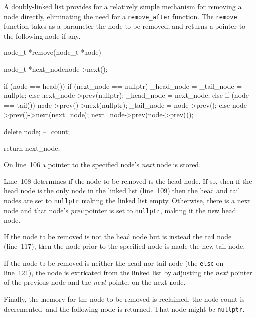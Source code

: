 \documentclass{article}
\begin{document}
  A doubly-linked list provides for a relatively simple mechanism for removing a node directly, eliminating the need for a \verb|remove_after| function. The \verb|remove| function takes as a parameter the node to be removed, and returns a pointer to the following node if any.
  \begin{lstcpp}
  node_t *remove(node_t *node) {
    node_t *next_node{node->next()};

    if (node == head()) {
      if (next_node == nullptr) {
        _head_node = _tail_node = nullptr;
      }
      else {
        next_node->prev(nullptr);
        _head_node = next_node;
      }
    }
    else if (node == tail()) {
      node->prev()->next(nullptr);
      _tail_node = node->prev();
    }
    else {
      node->prev()->next(next_node);
      next_node->prev(node->prev());
    }

    delete node;
    --_count;

    return next_node;
  }\end{lstcpp}

  On line~106 a pointer to the specified node's \emph{next} node is stored.

  Line~108 determines if the node to be removed is the head node. If so, then if the head node is the only node in the linked list (line~109) then the head and tail nodes are set to \verb|nullptr| making the linked list empty. Otherwise, there is a next node and that node's \emph{prev} pointer is set to \verb|nullptr|, making it the new head node.

  If the node to be removed is not the head node but is instead the tail node (line~117), then the node prior to the specified node is made the new tail node.

  If the node to be removed is neither the head nor tail node (the \verb|else| on line~121), the node is extricated from the linked list by adjusting the \emph{next} pointer of the previous node and the \emph{next} pointer on the next node.

  Finally, the memory for the node to be removed is reclaimed, the node count is decremented, and the following node is returned. That node might be \verb|nullptr|.
\end{document}
